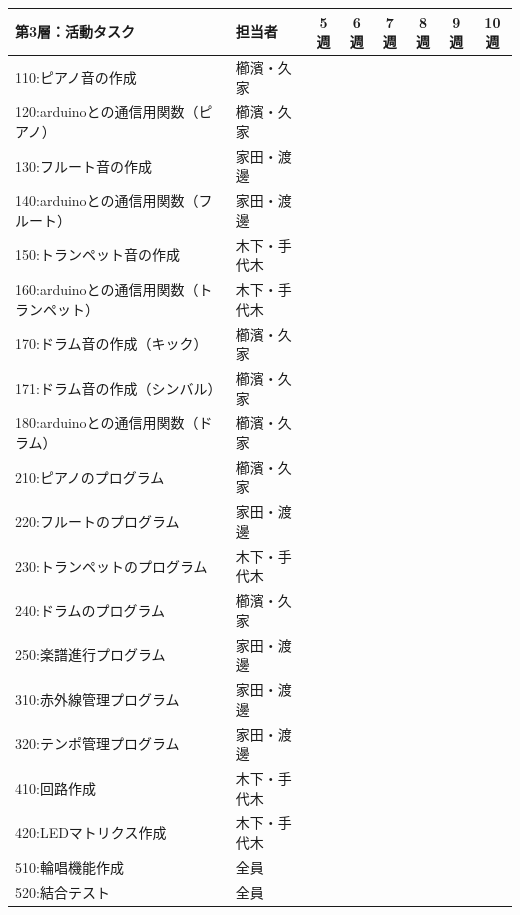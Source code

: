 \documentclass[a4paper,11pt]{ltjsarticle}
\providecommand{\％}{\%}
\begin{document}
\begin{longtable}{|p{6.2cm}|p{2.3cm}|c|c|c|c|c|c|}
\hline
\rowcolor[gray]{0.9}
第3層：活動タスク & 担当者 & 5週 & 6週 & 7週 & 8週 & 9週 & 10週 \\
\hline
110:ピアノ音の作成 & 櫛濱・久家 & \cellcolor{ganttCell} & & \cellcolor{ganttCell} & & & \\
\hline
120:arduinoとの通信用関数（ピアノ） & 櫛濱・久家 & \cellcolor{ganttCell} & & & & & \\
\hline
130:フルート音の作成 & 家田・渡邊 & \cellcolor{ganttCell} & & & & & \\
\hline
140:arduinoとの通信用関数（フルート） & 家田・渡邊 & \cellcolor{ganttCell} & & & & & \\
\hline
150:トランペット音の作成 & 木下・手代木 & \cellcolor{ganttCell} & & & & & \\
\hline
160:arduinoとの通信用関数（トランペット） & 木下・手代木 & \cellcolor{ganttCell} & & & & & \\
\hline
170:ドラム音の作成（キック） & 櫛濱・久家 & & \cellcolor{ganttCell} & & & & \\
\hline
171:ドラム音の作成（シンバル） & 櫛濱・久家 & & \cellcolor{ganttCell} & & & & \\
\hline
180:arduinoとの通信用関数（ドラム） & 櫛濱・久家 & & \cellcolor{ganttCell} & & & & \\
\hline
210:ピアノのプログラム & 櫛濱・久家 & \cellcolor{ganttCell} & & & & & \\
\hline
220:フルートのプログラム & 家田・渡邊 & \cellcolor{ganttCell} & & & & & \\
\hline
230:トランペットのプログラム & 木下・手代木 & \cellcolor{ganttCell} & & & & & \\
\hline
240:ドラムのプログラム & 櫛濱・久家 & & \cellcolor{ganttCell} & & & & \\
\hline
250:楽譜進行プログラム & 家田・渡邊 & & \cellcolor{ganttCell} & \cellcolor{ganttCell} & \cellcolor{ganttCell} & & \\
\hline
310:赤外線管理プログラム & 家田・渡邊 & & \cellcolor{ganttCell} & \cellcolor{ganttCell} & \cellcolor{ganttCell} & & \\
\hline
320:テンポ管理プログラム & 家田・渡邊 & & \cellcolor{ganttCell} & & & & \\
\hline
410:回路作成 & 木下・手代木 & & \cellcolor{ganttCell} & & & & \\
\hline
420:LEDマトリクス作成 & 木下・手代木 & & \cellcolor{ganttCell} & \cellcolor{ganttCell} & \cellcolor{ganttCell} & & \\
\hline
510:輪唱機能作成 & 全員 & & & \cellcolor{ganttCell} & \cellcolor{ganttCell} & & \\
\hline
520:結合テスト & 全員 & & & & & \cellcolor{ganttCell} & \cellcolor{ganttCell} \\
\hline
\end{longtable}
\end{document}
